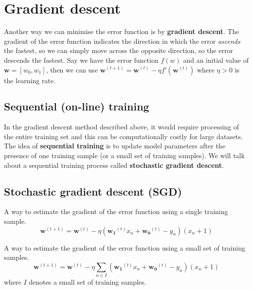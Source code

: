 \documentclass[11pt,fleqn]{book} %
\begin{document}
\section{Gradient descent}
Another way we can minimise the error function is by \textbf{gradient descent}. The gradient of the error function indicates the direction in which the error \textit{ascends} the fastest, so we can simply move across the opposite direction, so the error descends the fastest. Say we have the error function $f(w)$ and an initial value of $\bm{w} = [w_0, w_1]$, then we can use $\bm{w}^{(t+1)} = \bm{w}^{(t)} - \eta f'(\bm{w}^{(t)})$ where $\eta > 0$ is the learning rate.

\subsection{Sequential (on-line) training}
In the gradient descent method described above, it would require processing of the entire training set and this can be computationally costly for large datasets. The idea of \textbf{sequential training} is to update model parameters after the presence of one training sample (or a small set of training samples). We will talk about a sequential training process called \textbf{stochastic gradient descent}.

\subsection*{Stochastic gradient descent (SGD)}
\begin{definition}
	A way to estimate the gradient of the error function using a single training sample.
	$$\bm{w}^{(t+1)} = \bm{w}^{(t)} - \eta (\bm{w_1}^{(t)}x_n + \bm{w_0}^{(t)} - y_n)(x_n + 1)$$
\end{definition}

\begin{definition}
	A way to estimate the gradient of the error function using a small set of training samples.
	$$\bm{w}^{(t+1)} = \bm{w}^{(t)} - \eta \sum_{n \in I}(\bm{w_1}^{(t)}x_n + \bm{w_0}^{(t)} - y_n)(x_n + 1)$$
	where $I$ denotes a small set of training samples.
\end{definition}
\end{document}

